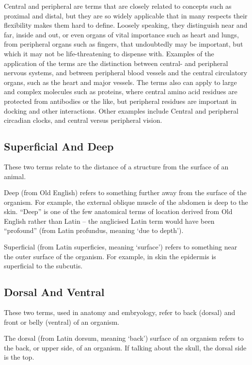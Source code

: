Central and peripheral are terms that are closely related to concepts such as proximal and distal, but they are so widely applicable that in many respects their flexibility makes them hard to define. Loosely speaking, they distinguish near and far, inside and out, or even organs of vital importance such as heart and lungs, from peripheral organs such as fingers, that undoubtedly may be important, but which it may not be life-threatening to dispense with. Examples of the application of the terms are the distinction between central- and peripheral nervous systems, and between peripheral blood vessels and the central circulatory organs, such as the heart and major vessels. The terms also can apply to large and complex molecules such as proteins, where central amino acid residues are protected from antibodies or the like, but peripheral residues are important in docking and other interactions. Other examples include Central and peripheral circadian clocks, and central versus peripheral vision.

\hypertarget{superficial-and-deep}{%
\subsection{Superficial And Deep}\label{superficial-and-deep}}

These two terms relate to the distance of a structure from the surface of an animal.

Deep (from Old English) refers to something further away from the surface of the organism. For example, the external oblique muscle of the abdomen is deep to the skin. ``Deep'' is one of the few anatomical terms of location derived from Old English rather than Latin -- the anglicised Latin term would have been ``profound'' (from Latin profundus, meaning `due to depth').

Superficial (from Latin superficies, meaning `surface') refers to something near the outer surface of the organism. For example, in skin the epidermis is superficial to the subcutis.

\hypertarget{dorsal-and-ventral}{%
\subsection{Dorsal And Ventral}\label{dorsal-and-ventral}}

These two terms, used in anatomy and embryology, refer to back (dorsal) and front or belly (ventral) of an organism.

The dorsal (from Latin dorsum, meaning `back') surface of an organism refers to the back, or upper side, of an organism. If talking about the skull, the dorsal side is the top.

